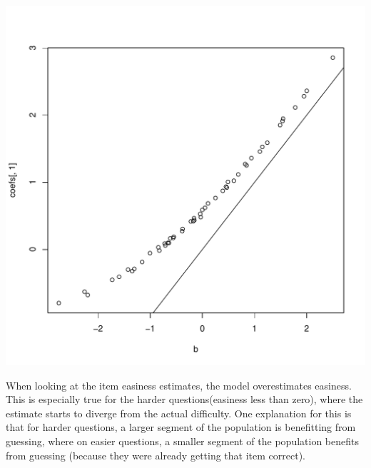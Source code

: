 \documentclass{article}\usepackage[]{graphicx}\usepackage[]{color}
\makeatletter
\def\maxwidth{ %
  \ifdim\Gin@nat@width>\linewidth
    \linewidth
  \else
    \Gin@nat@width
  \fi
}
\newenvironment{knitrout}{}{} %
\makeatother
\begin{document}
\begin{knitrout}
\color{fgcolor}
\includegraphics[width=\maxwidth]{figure/unnamed-chunk-10-1} 

\end{knitrout}

When looking at the item easiness estimates, the model overestimates easiness.  This is especially true for the harder questions(easiness less than zero), where the estimate starts to diverge from the actual difficulty.  One explanation for this is that for harder questions, a larger segment of the population is benefitting from guessing, where on easier questions, a smaller segment of the population benefits from guessing (because they were already getting that item correct).
\end{document}
